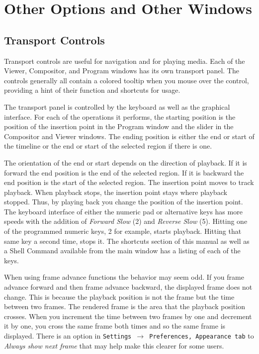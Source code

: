 \section{Other Options and Other Windows}%
\label{sec:other_options_and_other_windows}

\subsection{Transport Controls}%
\label{sub:transport_controls}

Transport controls are useful for navigation and for playing media.  
Each of the Viewer, Compositor, and Program windows has its own transport panel.  
The controls generally all contain a colored tooltip when you mouse over the control, providing a hint of their function and shortcuts for usage.

The transport panel is controlled by the keyboard as well as the graphical interface. 
For each of the operations it performs, the starting position is the position of the insertion point in the Program window and the slider in the Compositor and Viewer windows. 
The ending position is either the end or start of the timeline or the end or start of the selected region if there is one.

The orientation of the end or start depends on the direction of playback. 
If it is forward the end position is the end of the selected region. 
If it is backward the end position is the start of the selected region.  
The insertion point moves to track playback. 
When playback stops, the insertion point stays where playback stopped. 
Thus, by playing back you change the position of the insertion point. 
The keyboard interface of either the numeric pad or alternative keys has more speeds with the addition of \emph{Forward Slow} (2) and \emph{Reverse Slow} (5).  
Hitting one of the programmed numeric keys, 2 for example, starts playback.
Hitting that same key a second time, stops it.
The shortcuts section of this manual as well as a Shell Command available from the \CGG{} main window has a listing of each of the keys.

When using frame advance functions the behavior may seem odd. 
If you frame advance forward and then frame advance backward, the displayed frame does not change. 
This is because the playback position is not the frame but the time between two frames. 
The rendered frame is the area that the playback position crosses. 
When you increment the time between two frames by one and decrement it by one, you cross the same frame both times and so the same frame is displayed.  
There is an option in \texttt{Settings $\rightarrow$ Preferences, Appearance tab} to \textit{Always show next frame} that may help make this clearer for some users.

